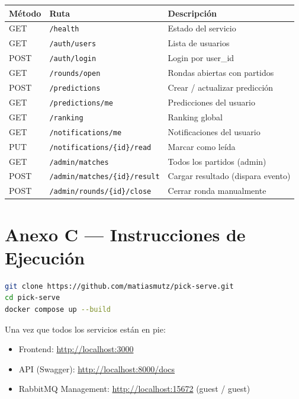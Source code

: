 \documentclass[12pt, a4paper]{article}
\begin{document}
\begin{center}
\small
\begin{tabular}{lll}
\toprule
Método & Ruta & Descripción \\
\midrule
GET  & \texttt{/health}                           & Estado del servicio \\
GET  & \texttt{/auth/users}                       & Lista de usuarios \\
POST & \texttt{/auth/login}                       & Login por user\_id \\
GET  & \texttt{/rounds/open}                      & Rondas abiertas con partidos \\
POST & \texttt{/predictions}                      & Crear / actualizar predicción \\
GET  & \texttt{/predictions/me}                   & Predicciones del usuario \\
GET  & \texttt{/ranking}                          & Ranking global \\
GET  & \texttt{/notifications/me}                 & Notificaciones del usuario \\
PUT  & \texttt{/notifications/\{id\}/read}        & Marcar como leída \\
GET  & \texttt{/admin/matches}                    & Todos los partidos (admin) \\
POST & \texttt{/admin/matches/\{id\}/result}      & Cargar resultado (dispara evento) \\
POST & \texttt{/admin/rounds/\{id\}/close}        & Cerrar ronda manualmente \\
\bottomrule
\end{tabular}
\end{center}

\section*{Anexo C — Instrucciones de Ejecución}

\begin{lstlisting}[language=bash, caption={Levantar el sistema completo.}]
git clone https://github.com/matiasmutz/pick-serve.git
cd pick-serve
docker compose up --build
\end{lstlisting}

Una vez que todos los servicios están en pie:

\begin{itemize}[noitemsep]
  \item Frontend: \url{http://localhost:3000}
  \item API (Swagger): \url{http://localhost:8000/docs}
  \item RabbitMQ Management: \url{http://localhost:15672} (guest / guest)
\end{itemize}
\end{document}
